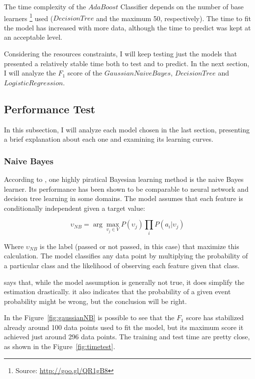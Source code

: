 \documentclass[a4paper]{article}
\begin{document}
The time complexity of the $AdaBoost$ Classifier depends on the number of base learners \footnote{Source: \url{http://goo.gl/QR1gB8}} used ($Decision Tree$ and the maximum 50, respectively). The time to fit the model has increased with more data, although the time to predict was kept at an acceptable level.

Considering the resources constraints, I will keep testing just the models that presented a relatively stable time both to test and to predict. In the next section, I will analyze the $F_1$ score of the $Gaussian Naive Bayes$, $Decision Tree$ and $Logistic Regression$.

\subsection{Performance Test}

In this subsection, I will analyze each model chosen in the last section, presenting a brief explanation about each one and examining its learning curves.

\subsubsection{Naive Bayes}
According to \cite{Mitchell}, one highly piratical Bayesian learning method is the naive Bayes learner. Its performance has been shown to be comparable to neural network and decision tree learning in some domains. The model assumes that each feature is conditionally independent given a target value:

$$\upsilon_{NB} = \arg\max_{v_j \in V}P(\upsilon_j) \prod_i P(a_i | \upsilon_j) $$

Where $\upsilon_{NB}$ is the label (passed or not passed, in this case) that maximize this calculation. The model classifies any data point by multiplying the probability of a particular class and the likelihood of observing each feature given that class.

\cite{Hastie_2009} says that, while the model assumption is generally not true, it does simplify the estimation drastically. it also indicates that the probability of a given event probability might be wrong, but the conclusion will be right.

In the Figure~\ref{fig:gaussianNB} is possible to see that the $F_1$ score has stabilized already around 100 data points used to fit the model, but its maximum score it achieved just around 296 data points. The training and test time are pretty close, as shown in the Figure~\ref{fig:timetest}.
\end{document}
